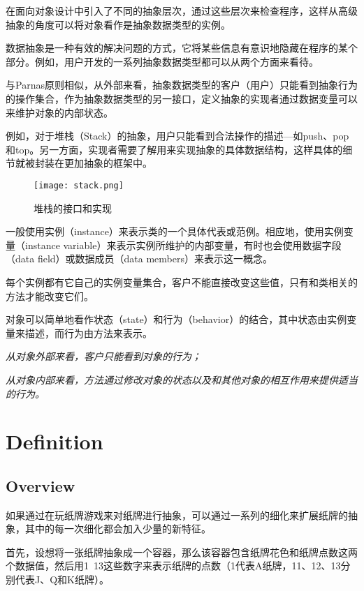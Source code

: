 在面向对象设计中引入了不同的抽象层次，通过这些层次来检查程序，这样从高级抽象的角度可以将对象看作是抽象数据类型的实例。

数据抽象是一种有效的解决问题的方式，它将某些信息有意识地隐藏在程序的某个部分。例如，用户开发的一系列抽象数据类型都可以从两个方面来看待。

与Parnas原则相似，从外部来看，抽象数据类型的客户（用户）只能看到抽象行为的操作集合，作为抽象数据类型的另一接口，定义抽象的实现者通过数据变量可以来维护对象的内部状态。

例如，对于堆栈（Stack）的抽象，用户只能看到合法操作的描述—如push、pop和top。另一方面，实现者需要了解用来实现抽象的具体数据结构，这样具体的细节就被封装在更加抽象的框架中。

\begin{figure}[htbp]
\centering
\texttt{[image: stack.png]}
\caption{堆栈的接口和实现}
\label{fig:stack}
\end{figure}

一般使用实例（instance）来表示类的一个具体代表或范例。相应地，使用实例变量（instance variable）来表示实例所维护的内部变量，有时也会使用数据字段（data field）或数据成员（data members）来表示这一概念。

每个实例都有它自己的实例变量集合，客户不能直接改变这些值，只有和类相关的方法才能改变它们。

对象可以简单地看作状态（state）和行为（behavior）的结合，其中状态由实例变量来描述，而行为由方法来表示。

\begin{compactitem}
\item \textsl{从对象外部来看，客户只能看到对象的行为；}
\item \textsl{从对象内部来看，方法通过修改对象的状态以及和其他对象的相互作用来提供适当的行为。}
\end{compactitem}


\chapter{Definition}



\section{Overview}

如果通过在玩纸牌游戏来对纸牌进行抽象，可以通过一系列的细化来扩展纸牌的抽象，其中的每一次细化都会加入少量的新特征。

首先，设想将一张纸牌抽象成一个容器，那么该容器包含纸牌花色和纸牌点数这两个数据值，然后用1~13这些数字来表示纸牌的点数（1代表A纸牌，11、12、13分别代表J、Q和K纸牌）。

